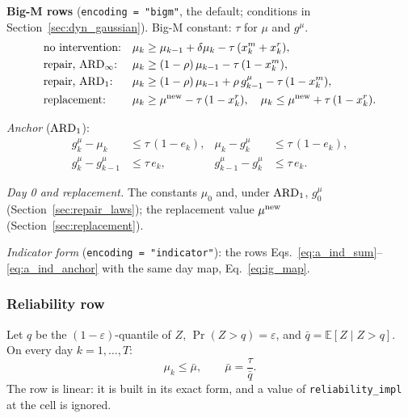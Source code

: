 \textbf{Big-M rows} (\texttt{encoding = "bigm"}, the default; conditions in
Section~\ref{sec:dyn_gaussian}). Big-M constant: $\tau$ for $\mu$ and $g^{\mu}$.
\begin{align}
  &\text{no intervention:} & \mu_k &\geq \mu_{k-1} + \delta\mu_k - \tau\,(x^m_k + x^r_k),
    \label{eq:ig_mu_carry} \\
  &\text{repair, } \mathrm{ARD}_{\infty}\text{:} & \mu_k &\geq (1-\rho)\,\mu_{k-1} - \tau\,(1 - x^m_k),
    \label{eq:ig_mu_inf} \\
  &\text{repair, } \mathrm{ARD}_{1}\text{:} & \mu_k &\geq (1-\rho)\,\mu_{k-1} + \rho\, g^{\mu}_{k-1}
    - \tau\,(1 - x^m_k),
    \label{eq:ig_mu_one} \\
  &\text{replacement:} & \mu_k &\geq \mu^{\mathrm{new}} - \tau\,(1 - x^r_k), \quad
    \mu_k \leq \mu^{\mathrm{new}} + \tau\,(1 - x^r_k).
    \label{eq:ig_mu_repl}
\end{align}

\emph{Anchor} ($\mathrm{ARD}_{1}$):
\begin{align}
  g^{\mu}_k - \mu_k &\leq \tau\,(1 - e_k), & \mu_k - g^{\mu}_k &\leq \tau\,(1 - e_k),
    \label{eq:ig_anchor_set} \\
  g^{\mu}_k - g^{\mu}_{k-1} &\leq \tau\, e_k, & g^{\mu}_{k-1} - g^{\mu}_k &\leq \tau\, e_k.
    \label{eq:ig_anchor_keep}
\end{align}

\emph{Day 0 and replacement.} The constants $\mu_0$ and, under $\mathrm{ARD}_{1}$, $g^{\mu}_0$
(Section~\ref{sec:repair_laws}); the replacement value $\mu^{\mathrm{new}}$
(Section~\ref{sec:replacement}).

\emph{Indicator form} (\texttt{encoding = "indicator"}): the rows
Eqs.~\eqref{eq:a_ind_sum}--\eqref{eq:a_ind_anchor} with the same day map,
Eq.~\eqref{eq:ig_map}.

\subsubsection{Reliability row}

Let $q$ be the $(1-\varepsilon)$-quantile of $Z$, $\Pr(Z > q) = \varepsilon$, and
$\bar q = \mathbb{E}[Z \mid Z > q]$. On every day $k = 1, \ldots, T$:
\begin{equation}
  \mu_k \leq \bar\mu, \qquad \bar\mu = \frac{\tau}{\bar q}.
  \label{eq:ig_row}
\end{equation}
The row is linear: it is built in its exact form, and a value of
\texttt{reliability\_impl} at the cell is ignored.


